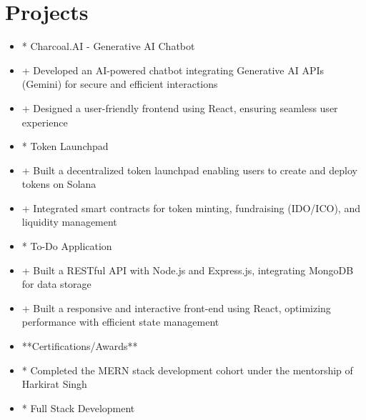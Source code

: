 \documentclass[10pt]{article}
\begin{document}
\section*{Projects}
\begin{itemize}[leftmargin=*]

  \item * Charcoal.AI - Generative AI Chatbot

  \item + Developed an AI-powered chatbot integrating Generative AI APIs (Gemini) for secure and efficient interactions

  \item + Designed a user-friendly frontend using React, ensuring seamless user experience

  \item * Token Launchpad

  \item + Built a decentralized token launchpad enabling users to create and deploy tokens on Solana

  \item + Integrated smart contracts for token minting, fundraising (IDO/ICO), and liquidity management

  \item * To-Do Application

  \item + Built a RESTful API with Node.js and Express.js, integrating MongoDB for data storage

  \item + Built a responsive and interactive front-end using React, optimizing performance with efficient state management

  \item **Certifications/Awards**

  \item * Completed the MERN stack development cohort under the mentorship of Harkirat Singh

  \item * Full Stack Development

\end{itemize}
\end{document}
